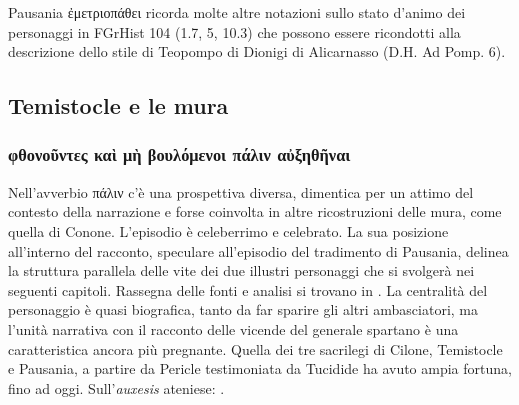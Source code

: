 {            Pausania  \textgreek{ἐμετριοπάθει} ricorda molte altre notazioni sullo stato d'animo dei personaggi in FGrHist 104 (1.7, 5, 10.3) che possono essere ricondotti alla descrizione dello stile di Teopompo  di Dionigi di Alicarnasso (D.H. Ad Pomp. 6). 
            \subsection*{Temistocle e le mura}\label{bkm:RefHeading697021501267828}
            \subsubsection{\textgreek{φθονοῦντες καὶ μὴ βουλόμενοι πάλιν αὐξηθῆναι}}
           Nell'avverbio \textgreek{πάλιν} c'è una prospettiva diversa, dimentica per un attimo del contesto della narrazione e forse coinvolta in altre ricostruzioni delle mura, come quella di Conone.  L'episodio è celeberrimo e celebrato. La sua posizione all'interno del racconto, speculare all'episodio del tradimento di Pausania, delinea la struttura parallela delle vite dei due illustri personaggi che si svolgerà nei seguenti capitoli. Rassegna delle fonti e analisi si trovano in \cite[82 e n.15]{CulassoGastaldi1990}. La centralità del personaggio è quasi biografica, tanto da far sparire gli altri ambasciatori, ma l'unità narrativa con il racconto delle vicende del generale spartano è una caratteristica ancora più pregnante. Quella dei tre sacrilegi di Cilone, Temistocle e Pausania, a partire da Pericle  testimoniata da Tucidide ha avuto ampia fortuna, fino ad oggi. Sull'\emph{auxesis} ateniese: \cite[447]{Parmeggiani2011}.
}
